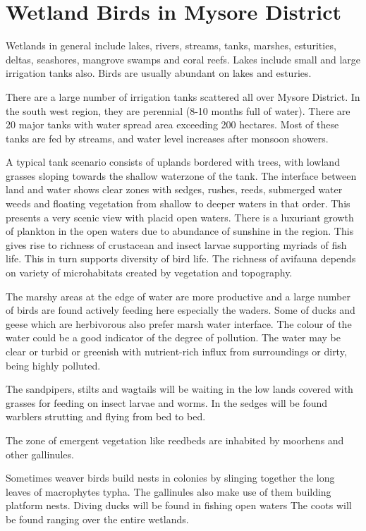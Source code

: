 \chapter{Wetland Birds in Mysore District} 

Wetlands in general include lakes, rivers, streams, 
tanks, marshes, esturities, deltas, seashores, mangrove swamps 
and coral reefs. Lakes include small and large irrigation 
tanks also. Birds are usually abundant on lakes and esturies. 

There are a large number of irrigation tanks scattered 
all over Mysore District. In the south west region, they are 
perennial (8-10 months full of water). There are 20 major 
tanks with water spread area exceeding 200 hectares. Most 
of these tanks are fed by streams, and water level increases 
after monsoon showers. 

A typical tank scenario consists of uplands bordered 
with trees, with lowland grasses sloping towards the shallow 
waterzone of the tank. The interface between land and water 
shows clear zones with sedges, rushes, reeds, submerged water 
weeds and floating vegetation from shallow to deeper waters 
in that order. This presents a very scenic view with placid 
open waters. There is a luxuriant growth of plankton in the 
open waters due to abundance of sunshine in the region. This 
gives rise to richness of crustacean and insect larvae 
supporting myriads of fish life. This in turn supports 
diversity of bird life. The richness of avifauna depends on 
variety of microhabitats created by vegetation and 
topography. 

The marshy areas at the edge of water are more
productive and a large number of birds are found actively 
feeding here especially the waders. Some of ducks and geese 
which are herbivorous also prefer marsh water interface. The 
colour of the water could be a good indicator of the degree 
of pollution. The water may be clear or turbid or greenish 
with nutrient-rich influx from surroundings or dirty, being 
highly polluted. 

The sandpipers, stilts and wagtails will be waiting in 
the low lands covered with grasses for feeding on insect 
larvae and worms. In the sedges will be found warblers 
strutting and flying from bed to bed. 

The zone of emergent vegetation like reedbeds are 
inhabited by moorhens and other gallinules. 

Sometimes weaver birds build nests in colonies by 
slinging together the long leaves of macrophytes typha. The 
gallinules also make use of them building platform nests. 
Diving ducks will be found in fishing open waters The coots 
will be found ranging over the entire wetlands. 

